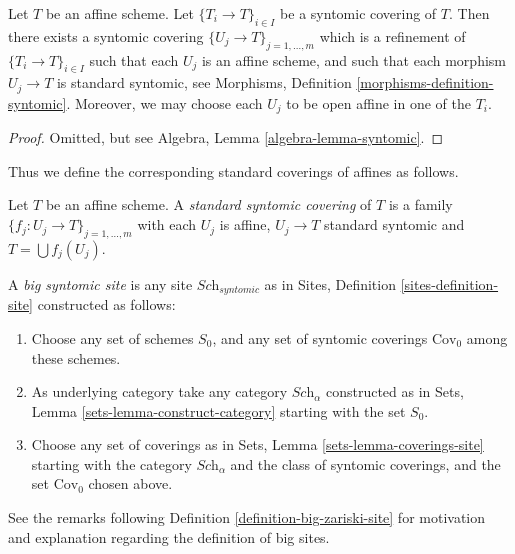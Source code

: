\begin{lemma}
\label{lemma-syntomic-affine}
Let $T$ be an affine scheme.
Let $\{T_i \to T\}_{i \in I}$ be a syntomic covering of $T$.
Then there exists a syntomic covering
$\{U_j \to T\}_{j = 1, \ldots, m}$ which is a refinement
of $\{T_i \to T\}_{i \in I}$ such that each $U_j$ is an affine
scheme, and such that each morphism $U_j \to T$ is standard
syntomic, see Morphisms, Definition \ref{morphisms-definition-syntomic}.
Moreover, we may choose each $U_j$ to be open affine in one of the $T_i$.
\end{lemma}

\begin{proof}
Omitted, but see Algebra, Lemma \ref{algebra-lemma-syntomic}.
\end{proof}

\noindent
Thus we define the corresponding standard coverings of affines as follows.

\begin{definition}
\label{definition-standard-syntomic}
Let $T$ be an affine scheme. A {\it standard syntomic covering} of $T$ is
a family $\{f_j : U_j \to T\}_{j = 1, \ldots, m}$ with each $U_j$ is
affine, $U_j \to T$ standard syntomic and $T = \bigcup f_j(U_j)$.
\end{definition}

\begin{definition}
\label{definition-big-syntomic-site}
A {\it big syntomic site} is any site $\textit{Sch}_{syntomic}$ as in
Sites, Definition \ref{sites-definition-site} constructed as follows:
\begin{enumerate}
\item Choose any set of schemes $S_0$, and any set of syntomic coverings
$\text{Cov}_0$ among these schemes.
\item As underlying category take any category $\textit{Sch}_\alpha$
constructed as in Sets, Lemma \ref{sets-lemma-construct-category}
starting with the set $S_0$.
\item Choose any set of coverings as in
Sets, Lemma \ref{sets-lemma-coverings-site} starting with the
category $\textit{Sch}_\alpha$ and the class of syntomic coverings,
and the set $\text{Cov}_0$ chosen above.
\end{enumerate}
\end{definition}

\noindent
See the remarks following Definition \ref{definition-big-zariski-site}
for motivation and explanation regarding the definition of big sites.

